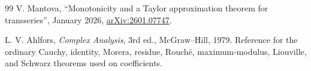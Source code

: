 \documentclass[11pt,letterpaper]{article}
\numberwithin{equation}{section}
\theoremstyle{definition}
\theoremstyle{remark}
\begin{document}
\begin{thebibliography}{99}
V. Mantova, ``Monotonicity and a Taylor approximation theorem for
transseries'', January 2026,
\href{https://arxiv.org/abs/2601.07747}{arXiv:2601.07747}.

L. V. Ahlfors, \emph{Complex Analysis}, 3rd ed., McGraw--Hill, 1979.
Reference for the ordinary Cauchy, identity, Morera, residue, Rouch\'e,
maximum-modulus, Liouville, and Schwarz theorems used on coefficients.
\end{thebibliography}
\end{document}
